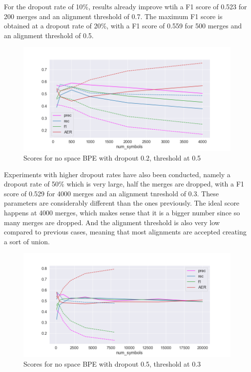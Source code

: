 For the dropout rate of 10\%, results already improve wtih a F1 score of 0.523 for 200 merges and an alignment threshold of 0.7. The maximum F1 score is obtained at a dropout rate of 20\%, with a F1 score of 0.559 for 500 merges and an alignment threshold of 0.5.

\begin{figure}[!ht]
    \centering
    \includegraphics[width=11.5cm]{../reports/scores_dropout_bpe/no space/0.2/scores_ns_0.5_thres.png}
    \caption{Scores for no space BPE with dropout 0.2, threshold at 0.5}
\end{figure}

Experiments with higher dropout rates have also been conducted, namely a dropout rate of 50\% which is very large, half the merges are dropped, with a F1 score of 0.529 for 4000 merges and an alignment tnreshold of 0.3. These parameters are considerably different than the ones previously. The ideal score happens at 4000 merges, which makes sense that it is a bigger number since so many merges are dropped. And the alignment threshold is also very low compared to previous cases, meaning that most alignments are accepted creating a sort of union.

\begin{figure}[!ht]
    \centering
    \includegraphics[width=11.5cm]{../reports/scores_dropout_bpe/no space/0.5/scores_ns_0.3_thres.png}
    \caption{Scores for no space BPE with dropout 0.5, threshold at 0.3}
\end{figure}
